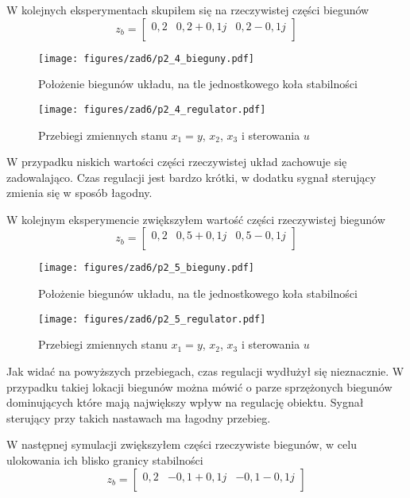 \documentclass[a4paper,titlepage,11pt,floatssmall]{mwrep}
\begin{document}
\indent W kolejnych eksperymentach skupiłem się na rzeczywistej części biegunów 
\[
z_b = 
\begin{bmatrix}
    0,2  &  0,2 + 0,1j  & 0,2 - 0,1j    \\     
\end{bmatrix}
\]

\begin{figure}[H]
\centering
\texttt{[image: figures/zad6/p2\_4\_bieguny.pdf]}
\caption{Położenie biegunów układu, na tle jednostkowego koła stabilności}
\end{figure} 

\begin{figure}[H]
\centering
\texttt{[image: figures/zad6/p2\_4\_regulator.pdf]}
\caption{Przebiegi zmiennych stanu $x_1 = y$, $x_2$, $x_3$ i sterowania $u$}
\end{figure}

W przypadku niskich wartości części rzeczywistej układ zachowuje się zadowalająco. Czas regulacji jest bardzo krótki, w dodatku sygnał sterujący zmienia się w sposób łagodny.
\newpage

\indent W kolejnym eksperymencie zwiększyłem wartość części rzeczywistej biegunów
\[
z_b = 
\begin{bmatrix}
    0,2  &  0,5 + 0,1j  & 0,5 - 0,1j    \\     
\end{bmatrix}
\]

\begin{figure}[H]
\centering
\texttt{[image: figures/zad6/p2\_5\_bieguny.pdf]}
\caption{Położenie biegunów układu, na tle jednostkowego koła stabilności}
\end{figure} 

\begin{figure}[H]
\centering
\texttt{[image: figures/zad6/p2\_5\_regulator.pdf]}
\caption{Przebiegi zmiennych stanu $x_1 = y$, $x_2$, $x_3$ i sterowania $u$}
\end{figure}
Jak widać na powyższych przebiegach, czas regulacji wydłużył się nieznacznie. W przypadku takiej lokacji biegunów można mówić o parze sprzężonych biegunów dominujących które mają największy wpływ na regulację obiektu. Sygnał sterujący przy takich nastawach ma łagodny przebieg.
\newpage

\indent W następnej symulacji zwiększyłem części rzeczywiste biegunów, w celu ulokowania ich blisko granicy stabilności
\[
z_b = 
\begin{bmatrix}
    0,2  &  -0,1 + 0,1j  & -0,1 - 0,1j    \\     
\end{bmatrix}
\]
\end{document}
